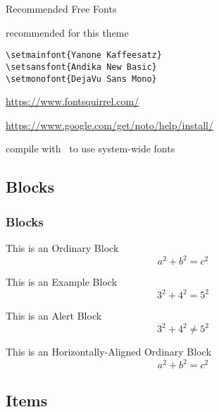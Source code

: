 \documentclass[compress]{beamer}
\begin{document}
\begin{frame}[fragile]{Recommended Free Fonts}
  \begin{description}
  \item[Selected Fonts] recommended for this theme\\
    \begin{lstlisting}[basicstyle = \ttfamily\small]
\setmainfont{Yanone Kaffeesatz}
\setsansfont{Andika New Basic}
\setmonofont{DejaVu Sans Mono}
    \end{lstlisting}
  \item[Download] {\small \url{https://www.fontsquirrel.com/}}
  \item[Install Fonts] {\small \url{https://www.google.com/get/noto/help/install/}}
  \item[Compilation] compile with \XeLaTeX~to use system-wide fonts
  \end{description}

\end{frame}


\subsection{Blocks}

\begin{frame}
  \frametitle{Blocks}
  \begin{block}{This is an Ordinary Block}
    \[
      a^2 + b^2 = c^2
    \]
  \end{block}
  \begin{exampleblock}{This is an Example Block}
    \[
      3^2+4^2 = 5^2
    \]
  \end{exampleblock}
  \begin{alertblock}{This is an Alert Block}
    \[
      3^2+4^2 \neq 5^2
    \]
  \end{alertblock}

  \centering
  \begin{minipage}{1.0\linewidth}
    \begin{block}{This is an Horizontally-Aligned Ordinary Block}
      \[
        a^2 + b^2 = c^2
      \]
    \end{block}
  \end{minipage}
\end{frame}

\subsection{Items}
\end{document}
